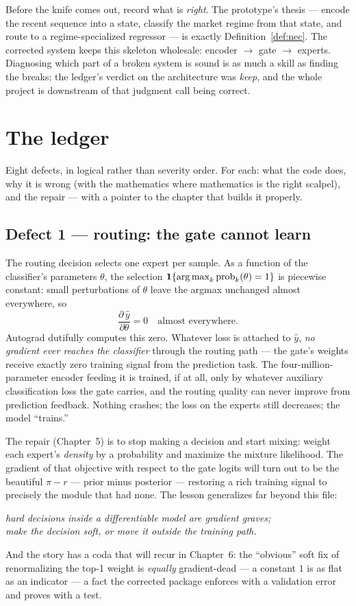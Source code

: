 Before the knife comes out, record what is \emph{right}. The prototype's
thesis --- encode the recent sequence into a state, classify the market
regime from that state, and route to a regime-specialized regressor --- is
exactly Definition~\ref{def:nec}. The corrected system keeps this skeleton
wholesale: encoder $\to$ gate $\to$ experts. Diagnosing which part of a
broken system is sound is as much a skill as finding the breaks; the ledger's
verdict on the architecture was \emph{keep}, and the whole project is
downstream of that judgment call being correct.

\section{The ledger}\label{sec:ledger}

Eight defects, in logical rather than severity order. For each: what the
code does, why it is wrong (with the mathematics where mathematics is the
right scalpel), and the repair --- with a pointer to the chapter that builds
it properly.

\subsection*{Defect 1 ---  routing: the gate cannot learn}

The routing decision 
selects one expert per sample. As a function of the classifier's parameters
$\theta$, the selection $\mathbf{1}\{\operatorname*{arg\,max}_k \mathrm{prob}_k(\theta) = 1\}$ is
piecewise constant: small perturbations of $\theta$ leave the argmax
unchanged almost everywhere, so
\[
  \frac{\partial\, \hat y}{\partial \theta} = 0
  \quad \text{almost everywhere.}
\]
Autograd dutifully computes this zero. Whatever loss is attached to
$\hat y$, \emph{no gradient ever reaches the classifier} through the routing
path --- the gate's weights receive exactly zero training signal from the
prediction task. The four-million-parameter encoder feeding it is trained,
if at all, only by whatever auxiliary classification loss the gate carries,
and the routing quality can never improve from prediction feedback. Nothing
crashes; the loss on the experts still decreases; the model ``trains.''

The repair (Chapter~5) is to stop making a decision and start mixing:
weight each expert's \emph{density} by a probability and maximize the
mixture likelihood. The gradient of that objective with respect to the gate
logits will turn out to be the beautiful $\pi - r$ --- prior minus posterior
--- restoring a rich training signal to precisely the module that had none.
The lesson generalizes far beyond this file:
\begin{center}
\emph{hard decisions inside a differentiable model are gradient graves;}\\
\emph{make the decision soft, or move it outside the training path.}
\end{center}
And the story has a coda that will recur in Chapter~6: the ``obvious'' soft
fix of renormalizing the top-1 weight is \emph{equally} gradient-dead --- a
constant $1$ is as flat as an indicator --- a fact the corrected package
enforces with a validation error and proves with a test.

